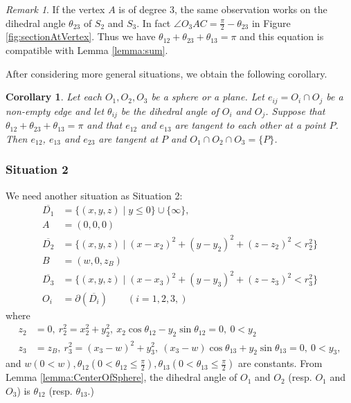 \documentclass[suppldata, dvipdfmx]{interact}
\theoremstyle{plain}%
\newtheorem{corollary}[theorem]{Corollary}
\theoremstyle{definition}
\theoremstyle{remark}
\newtheorem{remark}{Remark}
\theoremstyle{problemstyle}
\begin{document}
\begin{remark}
If the vertex $A$ is of degree $3$, the same observation works on the dihedral angle $\theta_{23}$ of $S_2$ and $S_3$.  In fact $\angle O_3AC=\frac{\pi}{2}-\theta_{23}$ in Figure \ref{fig:sectionAtVertex}.  Thus we have $\theta_{12}+\theta_{23}+\theta_{13}=\pi$ and this equation is compatible with Lemma \ref{lemma:sum}.
\end{remark}

After considering more general situations, we obtain the following corollary.

\begin{corollary}\label{cor:tangencyOfEdge}
Let each $O_1, O_2, O_3$ be a sphere or a plane.  Let $e_{ij}=O_i\cap O_j$ be a non-empty edge and let $\theta_{ij}$ be the dihedral angle of $O_i$ and $O_j$. Suppose that $\theta_{12}+\theta_{23}+\theta_{13}=\pi$ and that $e_{12}$ and $e_{13}$ are  tangent to each other at a point $P$.  Then $e_{12}$, $e_{13}$ and $e_{23}$ are tangent at $P$ and $O_1\cap O_2\cap O_3=\{ P \}$.   
\end{corollary}

\subsubsection{Situation 2}
We need another situation as Situation 2:
\begin{align*}
\overline{D_1}  &= \{ (x,y,z) \mid y \le 0 \} \cup \{\infty\} ,\\
A &= (0,0,0)\\
\overline{D_2}  &= \{ (x,y,z) \mid (x-x_2)^2+(y-y_2)^2+(z-z_2)^2<r_2^2\}\\
B &= (w,0,z_B)\\
\overline{D_3}  &= \{ (x,y,z) \mid (x-x_3)^2+(y-y_3)^2+(z-z_3)^2<r_3^2\}\\
O_i & = \partial(\overline{D_i}) \qquad(i=1,2,3,)
\end{align*}
where 
\begin{align*}
z_2&=0,\  r_2^2=x_2^2+y_2^2,\  x_2\cos\theta_{12}-y_2\sin\theta_{12}=0,\ 0 < y_2\\
z_3&=z_B,\  r_3^2=(x_3-w)^2+y_3^2,\  (x_3-w)\cos\theta_{13}+y_2\sin\theta_{13}=0,\ 0<y_3,
\end{align*} 
and $w (0<w), \theta_{12} (0<\theta_{12}\le \frac{\pi}{2}), \theta_{13}  (0<\theta_{13}\le \frac{\pi}{2})$ are constants.  From Lemma \ref{lemma:CenterOfSphere}, the dihedral angle of $O_1$ and $O_2$ (resp. $O_1$ and $O_3$) is $\theta_{12}$ (resp. $\theta_{13}$.)
\end{document}
